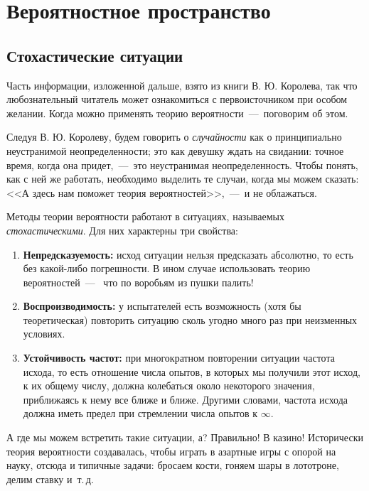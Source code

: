 \documentclass[../TV&MS.tex]{subfiles}
\begin{document}
\section{Вероятностное пространство}

\subsection{Стохастические ситуации}

\qquad Часть информации, изложенной дальше, взято из книги \cite{Korolev} В. Ю. Королева, 
так что любознательный читатель может ознакомиться с первоисточником при особом желании.
Когда можно применять теорию вероятности~---~поговорим об этом.
 
Следуя В. Ю. Королеву, будем говорить о \emph{случайности} как о принципиально
неустранимой неопределенности; это как девушку ждать на свидании: точное время, когда
она придет,~---~это неустранимая неопределенность. Чтобы понять, как с ней же работать, 
необходимо выделить те случаи, когда мы можем сказать: <<А здесь нам поможет теория 
вероятностей>>,~---~и не облажаться.

Методы теории вероятности работают в ситуациях, называемых \emph{стохастическими}. 
Для них характерны три свойства:
\begin{enumerate}[label={\bfseries \ding{118}\quad\arabic{enumi}:},leftmargin=*]
	\item \textbf{Непредсказуемость:} исход ситуации нельзя предсказать абсолютно, то
	есть без какой-либо погрешности. В ином случае использовать теорию вероятностей~---~ 
	что по воробьям из пушки палить!
	
	\item \textbf{Воспроизводимость:} у испытателей есть возможность (хотя бы теоретическая) 
	повторить ситуацию сколь угодно много раз при неизменных условиях.
	
	\item \textbf{Устойчивость частот:} при многократном повторении ситуации частота исхода,
	то есть отношение числа опытов, в которых мы получили этот исход, к их общему числу,
	должна колебаться около некоторого значения, приближаясь к нему все ближе и ближе.
	Другими словами, частота исхода должна иметь предел при стремлении
	числа опытов к $\infty$.
\end{enumerate}

А где мы можем встретить такие ситуации, а? Правильно! В казино!
Исторически теория вероятности создавалась, чтобы играть в азартные игры с опорой на науку, 
отсюда и типичные задачи: бросаем кости, гоняем шары в лототроне, делим ставку и~т.\,д.
\end{document}
